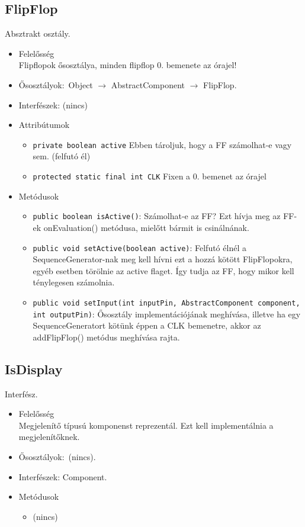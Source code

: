 \subsection{FlipFlop}
Absztrakt osztály.
\begin{itemize}
\item Felelősség\\
Flipflopok ősosztálya, minden flipflop 0. bemenete az órajel!
\item Ősosztályok:\ Object $\rightarrow{}$ AbstractComponent $\rightarrow{}$ FlipFlop.
\item Interfészek: (nincs)
\item Attribútumok $\ $
\begin{itemize}
	\item \texttt{private boolean active} Ebben tároljuk, hogy a FF számolhat-e vagy sem. (felfutó él)
	\item \texttt{protected static final int CLK} Fixen a 0. bemenet az órajel
\end{itemize}
\item Metódusok$\ $
\begin{itemize}
	\item \texttt{public boolean isActive()}: Számolhat-e az FF? Ezt hívja meg az FF-ek onEvaluation() metódusa, mielőtt  bármit is csinálnának.
	\item \texttt{public void setActive(boolean active)}: Felfutó élnél a SequenceGenerator-nak meg kell hívni ezt a hozzá kötött  FlipFlopokra, egyéb esetben törölnie az active flaget. Így tudja az FF, hogy  mikor kell ténylegesen számolnia.
	\item \texttt{public void setInput(int inputPin, AbstractComponent component, int outputPin)}: Ősosztály implementációjának meghívása, illetve ha egy SequenceGeneratort kötünk éppen a CLK bemenetre, akkor az addFlipFlop() metódus meghívása rajta.
\end{itemize}
\end{itemize}

\subsection{IsDisplay}
Interfész.
\begin{itemize}
\item Felelősség\\
Megjelenítő típusú komponenst reprezentál. Ezt kell implementálnia a megjelenítőknek.
\item Ősosztályok:\ (nincs).
\item Interfészek: Component.
\item Metódusok$\ $
\begin{itemize}
\item (nincs)
\end{itemize}
\end{itemize}

